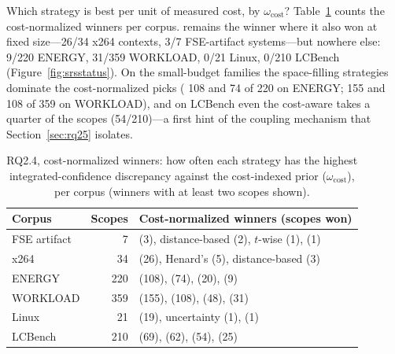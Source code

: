 Which strategy is best per unit of measured cost, by
$\omega_{\mathrm{cost}}$? Table~\ref{tab:winners} counts the
cost-normalized winners per corpus. \srs{} remains the winner where it
also won at fixed size---26/34 x264 contexts, 3/7 FSE-artifact
systems---but nowhere else: 9/220 ENERGY, 31/359 WORKLOAD, 0/21 Linux,
0/210 LCBench (Figure~\ref{fig:srsstatus}). On the small-budget families
the space-filling strategies dominate the cost-normalized picks
(\diShe{} 108 and \pairwise{} 74 of 220 on ENERGY; \pairwise{} 155 and
\diShe{} 108 of 359 on WORKLOAD), and on LCBench even the cost-aware
\pilotcost{} takes a quarter of the scopes (54/210)---a first hint of the
coupling mechanism that Section~\ref{sec:rq25} isolates.

\begin{table}[t]
  \centering\small
  \caption{RQ2.4, cost-normalized winners: how often each strategy has
  the highest integrated-confidence discrepancy against the cost-indexed
  prior ($\omega_{\mathrm{cost}}$), per corpus (winners with at least
  two scopes shown).}
  \label{tab:winners}
  \setlength{\tabcolsep}{5pt}
  \begin{tabular}{@{}lrl@{}}
    \toprule
    Corpus & Scopes & Cost-normalized winners (scopes won) \\
    \midrule
    FSE artifact & 7 & \srs{} (3), distance-based (2), $t$-wise (1), \randomS{} (1) \\
    x264 & 34 & \srs{} (26), Henard's (5), distance-based (3) \\
    ENERGY & 220 & \diShe{} (108), \pairwise{} (74), \balanced{} (20), \srs{} (9) \\
    WORKLOAD & 359 & \pairwise{} (155), \diShe{} (108), \balanced{} (48), \srs{} (31) \\
    Linux & 21 & \diShe{} (19), \textsf{uncertainty} (1), \balanced{} (1) \\
    LCBench & 210 & \diShe{} (69), \balanced{} (62), \pilotcost{} (54), \pairwise{} (25) \\
    \bottomrule
  \end{tabular}
\end{table}

